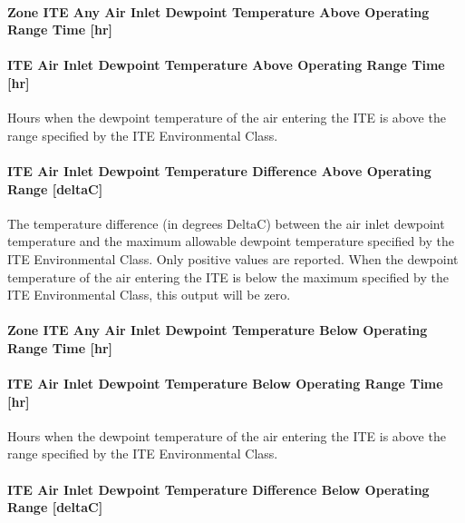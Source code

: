 \paragraph{Zone ITE Any Air Inlet Dewpoint Temperature Above Operating Range Time {[}hr{]}}\label{zone-ite-any-air-inlet-dewpoint-temperature-above-operating-range-time-hr}

\paragraph{ITE Air Inlet Dewpoint Temperature Above Operating Range Time {[}hr{]}}\label{ite-air-inlet-dewpoint-temperature-above-operating-range-time-hr}

Hours when the dewpoint temperature of the air entering the ITE is above the range specified by the ITE Environmental Class.

\paragraph{ITE Air Inlet Dewpoint Temperature Difference Above Operating Range {[}deltaC{]}}\label{ite-air-inlet-dewpoint-temperature-difference-above-operating-range-deltac}

The temperature difference (in degrees DeltaC) between the air inlet dewpoint temperature and the maximum allowable dewpoint temperature specified by the ITE Environmental Class. Only positive values are reported. When the dewpoint temperature of the air entering the ITE is below the maximum specified by the ITE Environmental Class, this output will be zero.

\paragraph{Zone ITE Any Air Inlet Dewpoint Temperature Below Operating Range Time {[}hr{]}}\label{zone-ite-any-air-inlet-dewpoint-temperature-below-operating-range-time-hr}

\paragraph{ITE Air Inlet Dewpoint Temperature Below Operating Range Time {[}hr{]}}\label{ite-air-inlet-dewpoint-temperature-below-operating-range-time-hr}

Hours when the dewpoint temperature of the air entering the ITE is above the range specified by the ITE Environmental Class.

\paragraph{ITE Air Inlet Dewpoint Temperature Difference Below Operating Range {[}deltaC{]}}\label{ite-air-inlet-dewpoint-temperature-difference-below-operating-range-deltac}

